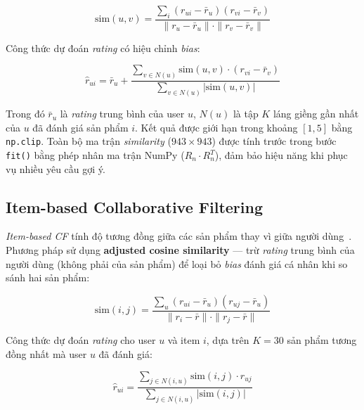 \documentclass[../BTL.tex]{subfiles}
\begin{document}
\begin{equation}
    \text{sim}(u, v) = \frac{\displaystyle\sum_{i}
        (r_{ui} - \bar{r}_u)(r_{vi} - \bar{r}_v)}
        {\|r_u - \bar{r}_u\| \cdot \|r_v - \bar{r}_v\|}
    \label{eq:user_sim}
\end{equation}

Công thức dự đoán \textit{rating} có hiệu chỉnh \textit{bias}:

\begin{equation}
    \hat{r}_{ui} = \bar{r}_u +
        \frac{\displaystyle\sum_{v \in N(u)} \text{sim}(u,v)
              \cdot (r_{vi} - \bar{r}_v)}
             {\displaystyle\sum_{v \in N(u)} |\text{sim}(u,v)|}
    \label{eq:user_pred}
\end{equation}

Trong đó $\bar{r}_u$ là \textit{rating} trung bình của user $u$, $N(u)$ là tập $K$
láng giềng gần nhất của $u$ đã đánh giá sản phẩm $i$. Kết quả được giới hạn trong
khoảng $[1, 5]$ bằng \texttt{np.clip}. Toàn bộ ma trận \textit{similarity}
($943 \times 943$) được tính trước trong bước \texttt{fit()} bằng phép nhân ma trận
NumPy ($R_n \cdot R_n^T$), đảm bảo hiệu năng khi phục vụ nhiều yêu cầu gợi ý.

\subsection{Item-based Collaborative Filtering}
\label{section:2.2.3}

\textit{Item-based CF} tính độ tương đồng giữa các sản phẩm thay vì giữa người
dùng~\cite{sarwar2001item}. Phương pháp sử dụng \textbf{adjusted cosine similarity}
— trừ \textit{rating} trung bình của người dùng (không phải của sản phẩm) để loại
bỏ \textit{bias} đánh giá cá nhân khi so sánh hai sản phẩm:

\begin{equation}
    \text{sim}(i, j) = \frac{\displaystyle\sum_{u}
        (r_{ui} - \bar{r}_u)(r_{uj} - \bar{r}_u)}
        {\|r_i - \bar{r}\| \cdot \|r_j - \bar{r}\|}
    \label{eq:item_sim}
\end{equation}

Công thức dự đoán \textit{rating} cho user $u$ và item $i$, dựa trên $K = 30$ sản
phẩm tương đồng nhất mà user $u$ đã đánh giá:

\begin{equation}
    \hat{r}_{ui} =
        \frac{\displaystyle\sum_{j \in N(i,u)} \text{sim}(i,j) \cdot r_{uj}}
             {\displaystyle\sum_{j \in N(i,u)} |\text{sim}(i,j)|}
    \label{eq:item_pred}
\end{equation}
\end{document}
